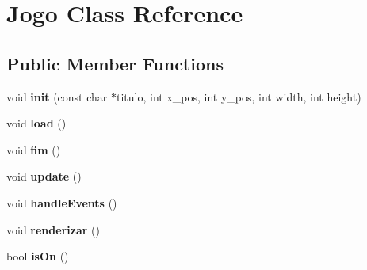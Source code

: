 \hypertarget{classJogo}{}\section{Jogo Class Reference}
\label{classJogo}
\subsection*{Public Member Functions}
\begin{DoxyCompactItemize}
\item 
void {\bfseries init} (const char $\ast$titulo, int x\+\_\+pos, int y\+\_\+pos, int width, int height)\hypertarget{classJogo_a021c342932693ebc2dc3ad755b354908}{}\label{classJogo_a021c342932693ebc2dc3ad755b354908}

\item 
void {\bfseries load} ()\hypertarget{classJogo_a9229a34f330f4ce1fa6ee477f03b29f1}{}\label{classJogo_a9229a34f330f4ce1fa6ee477f03b29f1}

\item 
void {\bfseries fim} ()\hypertarget{classJogo_a03485949abd3535220eb25d02d90d033}{}\label{classJogo_a03485949abd3535220eb25d02d90d033}

\item 
void {\bfseries update} ()\hypertarget{classJogo_ab8dd999068598580bad305548a45e08a}{}\label{classJogo_ab8dd999068598580bad305548a45e08a}

\item 
void {\bfseries handle\+Events} ()\hypertarget{classJogo_a3f18d36734798dbb13c54ad852809ead}{}\label{classJogo_a3f18d36734798dbb13c54ad852809ead}

\item 
void {\bfseries renderizar} ()\hypertarget{classJogo_ae2af03ceb36bdeb52308fb9ca87f4d6e}{}\label{classJogo_ae2af03ceb36bdeb52308fb9ca87f4d6e}

\item 
bool {\bfseries is\+On} ()\hypertarget{classJogo_a872ab9d72987ff6dda9d82f87022fdd4}{}\label{classJogo_a872ab9d72987ff6dda9d82f87022fdd4}

\end{DoxyCompactItemize}
